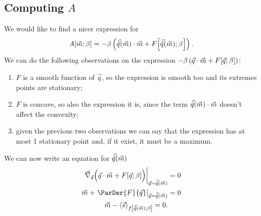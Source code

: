\subsection{Computing \(A\)}
We would like to find a nicer expression for
\begin{equation} \label{eq:expression-for-A}
   A{\left[\vec{m};\beta\right]} =
    -\beta \left(\vec{\hat{q}}{(\vec{m})}\cdot\vec{m} + F{\left[\vec{\hat{q}}{(\vec{m})};\beta\right]}\right).
\end{equation}
We can do the following observations on the expression 
\(-\beta \left(\vec{q}\cdot\vec{m} + F{\left[\vec{q};\beta\right]}\right)\):
\begin{enumerate}[i]
  \item \(F\) is a smooth function of \(\vec{q}\), so the expression is smooth too and its
    extremes points are stationary;
  \item \(F\) is concave, so also the expression it is, since the term \(\vec{\hat{q}}{(\vec{m})}\cdot\vec{m}\)
    doesn't affect the convexity;
  \item given the previous two observations we can say that the expression has at most 1 stationary
    point and, if it exist, it must be a maximum.
\end{enumerate}
We can now write an equation for \(\vec{\hat{q}}{(\vec{m})}\)
\begin{align}
  \nonumber
  \vec{\nabla}_{\vec{q}} \Big(\vec{q}\cdot\vec{m} + \FEn{\vec{q}}{\beta}\Big)
    \bigg|_{\vec{q}=\qhat{\vec{m}}}&=0 \\
  \nonumber
  \vec{m} + \left.\ParDer{F}{\vec{q}}\right|_{\vec{q}=\qhat{\vec{m}}}&=0 \\
  \label{eq:m-s-mean}
  \vec{m} - \Fmean{\vec{s}}{\qhat{\vec{m}}}{\beta} = 0.
\end{align}
